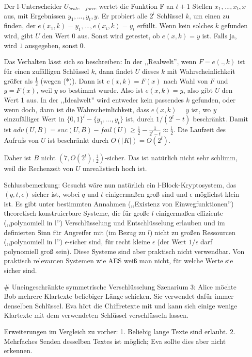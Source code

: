\documentclass[a4paper]{article}
\begin{document}
\begin{multicols}{3}
        Der l-Unterscheider $U_{brute-force}$ wertet die Funktion F an $t+1$ Stellen $x_1,...,x_t,x$ aus, mit Ergebnissen $y_1,...,y_t,y$. Er probiert alle $2^l$ Schlüssel $k$, um einen zu finden, der $e(x_1,k)=y_1 ,...,e(x_t,k) =y_t$ erfüllt. Wenn kein solches $k$ gefunden wird, gibt $U$ den Wert $0$ aus.
        Sonst wird getestet, ob $e(x,k)=y$ ist. Falls ja, wird $1$ ausgegeben, sonst $0$.

        Das Verhalten lässt sich so beschreiben: In der ,,Realwelt'', wenn $F=e(.,k)$ ist für einen zufälligen Schlüssel $k$, dann findet $U$  dieses $k$ mit Wahrscheinlichkeit größer als $\frac{1}{2}$ (wegen (*)). Dann ist $e(x,k) =F(x)$ nach Wahl von $F$ und $y=F(x)$, weil $y$ so bestimmt wurde.
        Also ist $e(x,k) =y$, also gibt $U$ den Wert 1 aus. In der ,,Idealwelt'' wird entweder kein passendes $k$ gefunden, oder wenn doch, dann ist die Wahrscheinlichkeit, dass $e(x,k) =y$ ist, wo $y$ einzufälliger Wert in $\{0,1\}^l-\{y_1,...,y_t\}$ ist, durch $1/(2^l-t)$ beschränkt. Damit ist $adv(U,B) = suc(U,B)-fail(U)\geq \frac{1}{2}-\frac{1}{2^l-t}\approx\frac{1}{2}$.
        Die Laufzeit des Aufrufs von $U$ ist beschränkt durch $O(|K|) =O(2^l)$.

        Daher ist $B$ nicht $(7, O(2^l),\frac{1}{2})$-sicher. Das ist natürlich nicht sehr schlimm, weil die Rechenzeit von $U$ unrealistisch hoch ist.

        Schlussbemerkung: Gesucht wäre nun natürlich ein l-Block-Kryptosystem, das $(q,t,\epsilon)$-sicher ist, wobei $q$ und $t$ einigermaßen groß sind und $\epsilon$ möglichst klein ist. Es gibt unter bestimmten Annahmen (,,Existenz von Einwegfunktionen'') theoretisch konstruierbare Systeme, die für große $l$ einigermaßen effiziente (,,polynomiell in l'') Verschlüsselung und Entschlüsselung erlauben und im definierten Sinn für Angreifer mit (im Bezug zu $l$) nicht zu großen Ressourcen (,,polynomiell in l'') $\epsilon$-sicher sind, für recht kleine $\epsilon$ (der Wert $1/\epsilon$ darf polynomiell groß sein). Diese Systeme sind aber praktisch nicht verwendbar. Von praktisch relevanten Systemen wie AES weiß man nicht, für welche Werte sie sicher sind.

        # Uneingeschränkte symmetrische Verschlüsselung
        Szenarium 3: Alice möchte Bob mehrere Klartexte beliebiger Länge schicken. Sie verwendet dafür immer denselben Schlüssel. Eva hört die Chiffretexte mit und kann sich einige wenige Klartexte mit dem verwendeten Schlüssel verschlüsseln lassen.

        Erweiterungen im Vergleich zu vorher:
        1. Beliebig lange Texte sind erlaubt.
        2. Mehrfaches Senden desselben Textes ist möglich; Eva sollte dies aber nicht erkennen.


\end{multicols}
\end{document}
